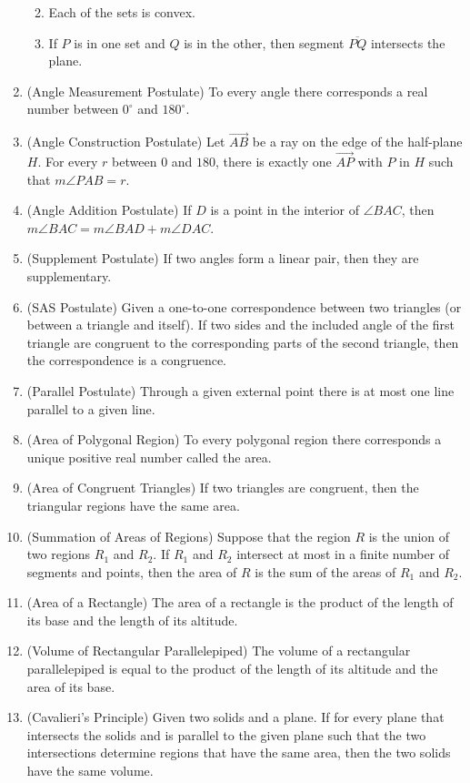 \documentclass[
]{book}
\providecommand{\tightlist}{%
  \setlength{\itemsep}{0pt}\setlength{\parskip}{0pt}}
\theoremstyle{definition}
\theoremstyle{definition}
\theoremstyle{definition}
\theoremstyle{definition}
\theoremstyle{remark}
\begin{document}
\begin{enumerate}
  \begin{enumerate}
  \def\labelenumii{\alph{enumii}.}
  \tightlist
  \item
    Each of the sets is convex.
  \item
    If \(P\) is in one set and \(Q\) is in the other, then segment \(\overline{PQ}\) intersects the plane.
  \end{enumerate}
\item
  (Angle Measurement Postulate) To every angle there corresponds a real number between \(0^\circ\) and \(180^\circ\).
\item
  (Angle Construction Postulate) Let \(\overrightarrow{AB}\) be a ray on the edge of the half-plane \(H\). For every \(r\) between \(0\) and \(180\), there is exactly one \(\overrightarrow{AP}\) with \(P\) in \(H\) such that \(m\angle PAB = r\).
\item
  (Angle Addition Postulate) If \(D\) is a point in the interior of \(\angle BAC\), then \(m\angle BAC = m\angle BAD + m\angle DAC\).
\item
  (Supplement Postulate) If two angles form a linear pair, then they are supplementary.
\item
  (SAS Postulate) Given a one-to-one correspondence between two triangles (or between a triangle and itself). If two sides and the included angle of the first triangle are congruent to the corresponding parts of the second triangle, then the correspondence is a congruence.
\item
  (Parallel Postulate) Through a given external point there is at most one line parallel to a given line.
\item
  (Area of Polygonal Region) To every polygonal region there corresponds a unique positive real number called the area.
\item
  (Area of Congruent Triangles) If two triangles are congruent, then the triangular regions have the same area.
\item
  (Summation of Areas of Regions) Suppose that the region \(R\) is the union of two regions \(R_1\) and \(R_2\). If \(R_1\) and \(R_2\) intersect at most in a finite number of segments and points, then the area of \(R\) is the sum of the areas of \(R_1\) and \(R_2\).
\item
  (Area of a Rectangle) The area of a rectangle is the product of the length of its base and the length of its altitude.
\item
  (Volume of Rectangular Parallelepiped) The volume of a rectangular parallelepiped is equal to the product of the length of its altitude and the area of its base.
\item
  (Cavalieri's Principle) Given two solids and a plane. If for every plane that intersects the solids and is parallel to the given plane such that the two intersections determine regions that have the same area, then the two solids have the same volume.
\end{enumerate}
\end{document}
